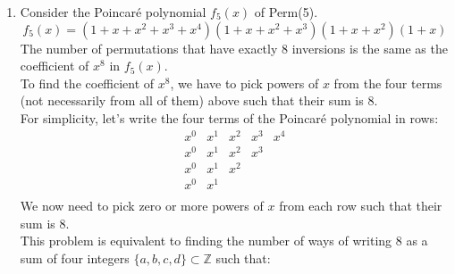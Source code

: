 \documentclass[a4paper,12pt]{article} %
\begin{document}
\begin{enumerate}
\item Consider the Poincaré polynomial $f_{5}(x)$ of Perm(5).
	$$
	f_{5}(x) = (1 + x + x^2 + x^3 + x^4)(1 + x + x^2 + x^3)(1 + x + x^2)(1 + x)
	$$
	The number of permutations that have exactly 8 inversions is the same as the coefficient of $x^8$ in $f_{5}(x)$.\\
	To find the coefficient of $x^8$, we have to pick powers of $x$ from the four terms (not necessarily from all of them) above such that their sum is 8.\\
	For simplicity, let's write the four terms of the Poincaré polynomial in rows:
	$$
	\begin{array}{ccccc}
		x^0 & x^1 & x^2 & x^3 & x^4\\
		x^0 & x^1 & x^2 & x^3\\
		x^0 & x^1 & x^2 & \\
		x^0 & x^1 & & \\
	\end{array}
	$$
	We now need to pick zero or more powers of $x$ from each row such that their sum is 8.\\
	This problem is equivalent to finding the number of ways of writing 8 as a sum of four integers $\{a, b, c, d\} \subset \mathbb{Z}$  such that:


\end{enumerate}
\end{document}
